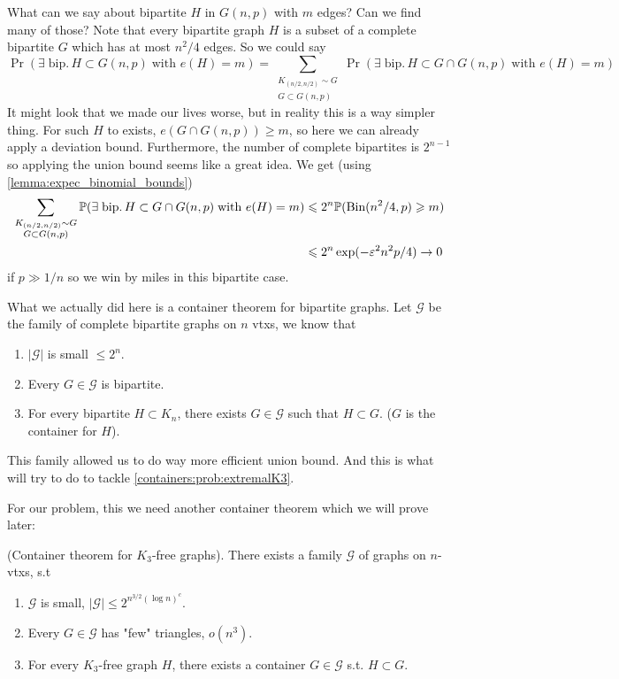 What can we say about bipartite $H$ in $G(n,p)$ with $m$ edges? Can
we find many of those?
Note that every bipartite graph $H$ is a subset of a complete
bipartite $G$ which has at most $n^2/4$ edges. So we could say
\[
	\Pr(\exists\; \text{bip.}\,H \subset G(n,p)\; \text{with } e(H) = m) =
	\sum_{\substack{K_{(n/2,n/2)} \sim G\\G \subset G(n,p)}}
	\Pr(\exists\; \text{bip.}\,H \subset G \cap G(n,p)\; \text{with } e(H) = m)
\]
It might look that we made our lives worse, but in reality this is a
way simpler thing. For such $H$ to exists, $e(G \cap G(n,p)) \geq m$, so
here we can already apply a deviation bound. Furthermore, the number
of complete bipartites is $2^{n-1}$ so applying the union bound seems
like a great idea.
We get (using \ref{lemma:expec_binomial_bounds})
\begin{align*}
	\sum_{\substack{K_{(n/2,n/2)} \sim G\\G \subset G(n,p)}}
	\mathbb{P}(\exists\; \text{bip.}\,H \subset G \cap G(n,p)\; \text{with }
	e(H) = m) &\leqslant
	2^n\mathbb{P}(\text{Bin}(n^2/4,p) \geqslant m)\\
	&\leqslant 2^n\exp(-\varepsilon^2n^2p/4) \rightarrow 0
\end{align*}
if $p \gg 1/n$ so we win by miles in this bipartite case.

What we actually did here is a container theorem for bipartite graphs.
Let $\mathcal{G}$ be the family of complete bipartite graphs on $n$ vtxs,
we know that
\begin{enumerate}[label=(\alph*)]
	\item $|\mathcal{G}|$ is small $\leq 2^n$.
	\item Every $G \in \mathcal{G}$ is bipartite.
	\item For every bipartite $H \subset K_n$, there exists $G \in
		\mathcal{G}$ such that $H \subset G$. ($G$ is the container for $H$).
\end{enumerate}
This family allowed us to do way more efficient union bound. And this
is what will try to do to tackle
\ref{containers:prob:extremalK3}.

For our problem, this we need another container theorem which we will
prove later:
\begin{theorem}
	\label{trm:container-k3-free-bad}
	(Container theorem for $K_3$-free graphs). There exists a family
	$\mathcal{G}$ of graphs on $n$-vtxs, s.t
	\begin{enumerate}[label=(\alph*)]
		\item $\mathcal{G}$ is small, $|\mathcal{G}| \leq 2^{n^{3/2}(\log n)^c}$.
		\item Every $G \in \mathcal{G}$ has "few" triangles, $o(n^3)$.
		\item For every $K_3$-free graph $H$, there exists a container $G
			\in \mathcal{G}$ s.t. $H \subset G$.
	\end{enumerate}
\end{theorem}

